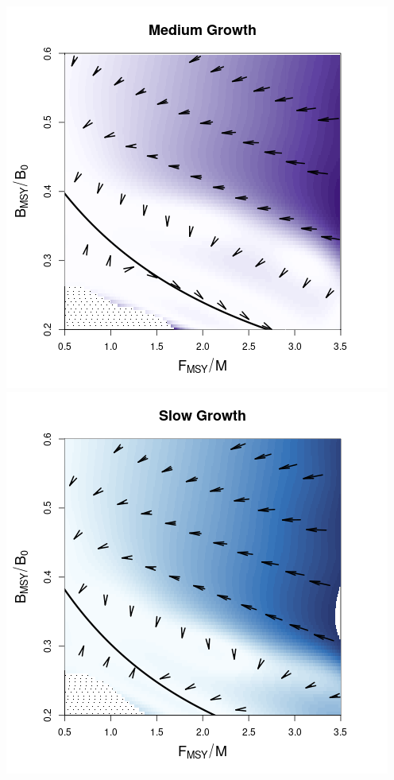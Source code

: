 \documentclass[a0paper,portrait]{baposter}
\begin{document}
\begin{poster}
{\begin{minipage}[h!]{0.61\textwidth}
\begin{minipage}[h!]{0.25\textwidth}
        	\includegraphics[width=\textwidth]{../../ddBias/directionalBiasDDSubFlatT45N150A0-1AS1K0.5N56Purples.png}\\
        	\includegraphics[width=\textwidth]{../../ddBias/directionalBiasDDSubFlatT45N150A0-1AS2K0.1N84EdgeBlues.png}
        	\end{minipage}


\end{minipage}}
\end{poster}
\end{document}
